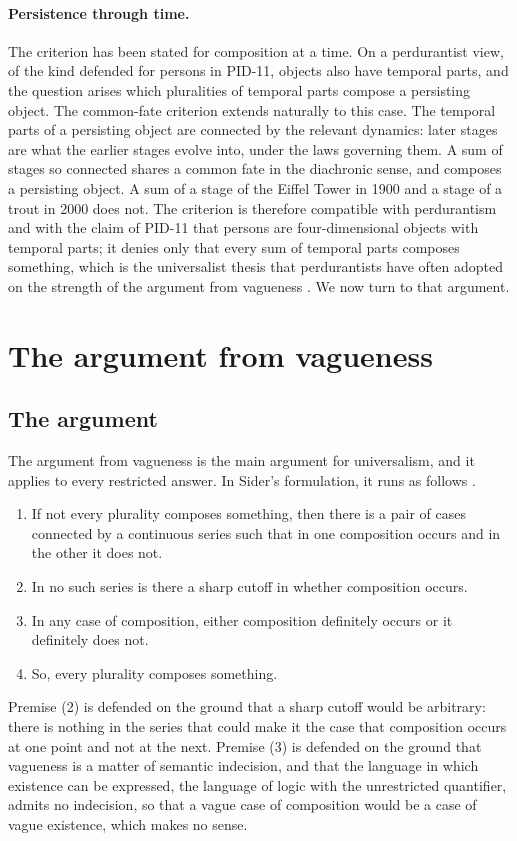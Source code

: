 \documentclass{situationist-preprint}
\begin{document}
\paragraph{Persistence through time.} The criterion has been stated for composition at a time. On a perdurantist view, of the kind defended for persons in PID-11, objects also have temporal parts, and the question arises which pluralities of temporal parts compose a persisting object. The common-fate criterion extends naturally to this case. The temporal parts of a persisting object are connected by the relevant dynamics: later stages are what the earlier stages evolve into, under the laws governing them. A sum of stages so connected shares a common fate in the diachronic sense, and composes a persisting object. A sum of a stage of the Eiffel Tower in 1900 and a stage of a trout in 2000 does not. The criterion is therefore compatible with perdurantism and with the claim of PID-11 that persons are four-dimensional objects with temporal parts; it denies only that every sum of temporal parts composes something, which is the universalist thesis that perdurantists have often adopted on the strength of the argument from vagueness \citep{Sider2001}. We now turn to that argument.

\section{The argument from vagueness}

\subsection{The argument}

The argument from vagueness is the main argument for universalism, and it applies to every restricted answer. In Sider's formulation, it runs as follows \citep[§4.9]{Sider2001}.
\begin{enumerate}[label=(\arabic*)]
\item If not every plurality composes something, then there is a pair of cases connected by a continuous series such that in one composition occurs and in the other it does not.
\item In no such series is there a sharp cutoff in whether composition occurs.
\item In any case of composition, either composition definitely occurs or it definitely does not.
\item So, every plurality composes something.
\end{enumerate}
Premise (2) is defended on the ground that a sharp cutoff would be arbitrary: there is nothing in the series that could make it the case that composition occurs at one point and not at the next. Premise (3) is defended on the ground that vagueness is a matter of semantic indecision, and that the language in which existence can be expressed, the language of logic with the unrestricted quantifier, admits no indecision, so that a vague case of composition would be a case of vague existence, which makes no sense.
\end{document}

